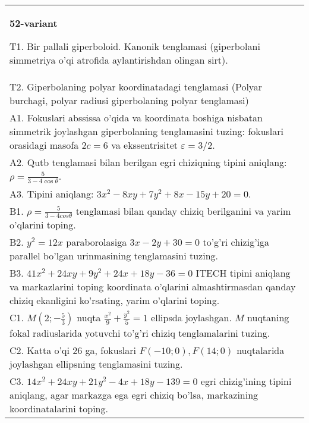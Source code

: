 \documentclass{article}
\begin{document}
\begin{tabular}{m{17cm}}
\textbf{52-variant}
\newline

T1. Bir pallali giperboloid. Kanonik tenglamasi (giperbolani simmetriya o'qi atrofida aylantirishdan olingan sirt).\\

T2. Giperbolaning polyar koordinatadagi tenglamasi (Polyar burchagi, polyar radiusi giperbolaning polyar tenglamasi)\\

A1. Fokuslari abssissa o'qida va koordinata boshiga nisbatan simmetrik joylashgan giperbolaning tenglamasini tuzing: fokuslari orasidagi masofa $2c=6$ va ekssentrisitet $\varepsilon=3/2$.\\

A2. Qutb tenglamasi bilan berilgan egri chiziqning tipini aniqlang: $\rho=\frac{5}{3-4\cos\theta}$.\\

A3. Tipini aniqlang: $3x^{2}-8xy+7y^{2}+8x-15y+20=0$.\\

B1. $\rho = \frac{5}{3 - 4cos\theta}$ tenglamasi bilan qanday chiziq berilganini va yarim o'qlarini toping.  \\

B2. $y^{2} = 12x$ paraborolasiga $3x - 2y + 30 = 0$ to'g'ri chizig'iga parallel bo'lgan urinmasining tenglamasini tuzing.  \\

B3. $41x^{2} + 24xy + 9y^{2} + 24x + 18y - 36 = 0$ ITECH tipini aniqlang va markazlarini toping koordinata o'qlarini almashtirmasdan qanday chiziq ekanligini ko'rsating, yarim o'qlarini toping.  \\

C1. $M(2; - \frac{5}{3})$ nuqta $\frac{x^{2}}{9} + \frac{y^{2}}{5} = 1$ ellipsda joylashgan. $M$ nuqtaning fokal radiuslarida yotuvchi to'g'ri chiziq tenglamalarini tuzing.  \\

C2. Katta o'qi 26 ga, fokuslari $F( - 10;0), F(14;0)$ nuqtalarida joylashgan ellipsning tenglamasini tuzing.  \\

C3. $14x^{2} + 24xy + 21y^{2} - 4x + 18y - 139 = 0$ egri chizig'ining tipini aniqlang, agar markazga ega egri chiziq bo'lsa, markazining koordinatalarini toping.  \\

\end{tabular}
\vspace{1cm}
\end{document}
